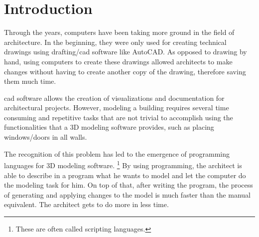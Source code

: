 
\section{Introduction}
\label{sec:introduction}



Through the years, computers have been taking more ground in the field of architecture.
In the beginning, they were only used for creating technical drawings using drafting/\gls{cad} software like AutoCAD.
As opposed to drawing by hand, using computers to create these drawings allowed architects to make changes without having to create another copy of the drawing, therefore saving them much time.


\gls{cad} software allows the creation of visualizations and documentation for architectural projects.
However, modeling a building requires several time consuming and repetitive tasks that are not trivial to accomplish using the functionalities that a 3D modeling software provides, such as placing windows/doors in all walls.


The recognition of this problem has led to the emergence of programming languages for 3D modeling software.%
\footnote{These are often called scripting languages.}
By using programming, the architect is able to describe in a program what he wants to model and let the computer do the modeling task for him.
On top of that, after writing the program, the process of generating and applying changes to the model is much faster than the manual equivalent.
The architect gets to do more in less time.

